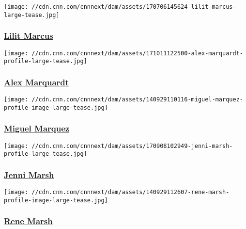 \href{/profiles/lilit-marcus}{}

\texttt{[image: //cdn.cnn.com/cnnnext/dam/assets/170706145624-lilit-marcus-large-tease.jpg]}

\hypertarget{lilit-marcus}{%
\subsubsection{\texorpdfstring{\href{/profiles/lilit-marcus}{Lilit
Marcus}}{Lilit Marcus}}\label{lilit-marcus}}

\href{/profiles/alex-marquardt}{}

\texttt{[image: //cdn.cnn.com/cnnnext/dam/assets/171011122500-alex-marquardt-profile-large-tease.jpg]}

\hypertarget{alex-marquardt}{%
\subsubsection{\texorpdfstring{\href{/profiles/alex-marquardt}{Alex
Marquardt}}{Alex Marquardt}}\label{alex-marquardt}}

\href{/profiles/miguel-marquez-profile}{}

\texttt{[image: //cdn.cnn.com/cnnnext/dam/assets/140929110116-miguel-marquez-profile-image-large-tease.jpg]}

\hypertarget{miguel-marquez}{%
\subsubsection{\texorpdfstring{\href{/profiles/miguel-marquez-profile}{Miguel
Marquez}}{Miguel Marquez}}\label{miguel-marquez}}

\href{/profiles/jenni-marsh-profile}{}

\texttt{[image: //cdn.cnn.com/cnnnext/dam/assets/170908102949-jenni-marsh-profile-large-tease.jpg]}

\hypertarget{jenni-marsh}{%
\subsubsection{\texorpdfstring{\href{/profiles/jenni-marsh-profile}{Jenni
Marsh}}{Jenni Marsh}}\label{jenni-marsh}}

\href{/profiles/rene-marsh-profile}{}

\texttt{[image: //cdn.cnn.com/cnnnext/dam/assets/140929112607-rene-marsh-profile-image-large-tease.jpg]}

\hypertarget{rene-marsh}{%
\subsubsection{\texorpdfstring{\href{/profiles/rene-marsh-profile}{Rene
Marsh}}{Rene Marsh}}\label{rene-marsh}}

